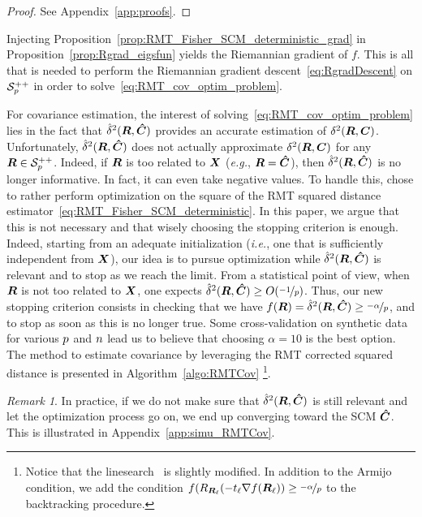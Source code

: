 \documentclass{article}
\theoremstyle{plain}
\theoremstyle{definition}
\theoremstyle{remark}
\newtheorem{remark}[theorem]{Remark}
\begin{document}
\begin{proof}
    See Appendix~\ref{app:proofs}.
\end{proof}
%
Injecting Proposition~\ref{prop:RMT_Fisher_SCM_deterministic_grad} in Proposition~\ref{prop:Rgrad_eigsfun} yields the Riemannian gradient of $f$.
This is all that is needed to perform the Riemannian gradient descent~\eqref{eq:RgradDescent} on $\mathcal{S}^{++}_{p}$ in order to solve~\eqref{eq:RMT_cov_optim_problem}.

For covariance estimation, the interest of solving~\eqref{eq:RMT_cov_optim_problem} lies in the fact that $\hat{\delta}^2(\boldsymbol{R},\boldsymbol{\hat{C}})$ provides an accurate estimation of $\delta^2(\boldsymbol{R},\boldsymbol{C})$.
Unfortunately, $\hat{\delta}^2(\boldsymbol{R},\boldsymbol{\hat{C}})$ does not actually approximate $\delta^2(\boldsymbol{R},\boldsymbol{C})$ for any $\boldsymbol{R}\in\mathcal{S}^{++}_{p}$.
Indeed, if $\boldsymbol{R}$ is too related to $\boldsymbol{X}$ (\emph{e.g.}, $\boldsymbol{R}=\boldsymbol{\hat{C}}$), then $\hat{\delta}^2(\boldsymbol{R},\boldsymbol{\hat{C}})$ is no longer informative.
In fact, it can even take negative values.
%
To handle this, \cite{tiomoko2019random} chose to rather perform optimization on the square of the RMT squared distance estimator~\eqref{eq:RMT_Fisher_SCM_deterministic}.
In this paper, we argue that this is not necessary and that wisely choosing the stopping criterion is enough.
Indeed, starting from an adequate initialization (\emph{i.e.}, one that is sufficiently independent from $\boldsymbol{X}$), our idea is to pursue optimization while $\hat{\delta}^2(\boldsymbol{R},\boldsymbol{\hat{C}})$ is relevant and to stop as we reach the limit.
%
From a statistical point of view, when $\boldsymbol{R}$ is not too related to $\boldsymbol{X}$, one expects $\hat{\delta}^2(\boldsymbol{R},\boldsymbol{\hat{C}})\geq O(\nicefrac{-1}{p})$.
Thus, our new stopping criterion consists in checking that we have $f(\boldsymbol{R})=\hat{\delta}^2(\boldsymbol{R},\boldsymbol{\hat{C}})\geq\nicefrac{-\alpha}{p}$, and to stop as soon as this is no longer true.
Some cross-validation on synthetic data for various $p$ and $n$ lead us to believe that choosing $\alpha=10$ is the best option.
%
The method to estimate covariance by leveraging the RMT corrected squared distance is presented in Algorithm~\ref{algo:RMTCov}%
\footnote{
    Notice that the linesearch~\cite{absil2009optimization,boumal2023introduction} is slightly modified.
    In addition to the Armijo condition, we add the condition $f(R_{\boldsymbol{R}_{\ell}}(-t_{\ell}\nabla f(\boldsymbol{R}_{\ell}))\geq\nicefrac{-\alpha}{p}$ to the backtracking procedure.
}.
\begin{remark}
    In practice, if we do not make sure that $\hat{\delta}^2(\boldsymbol{R},\boldsymbol{\hat{C}})$ is still relevant and let the optimization process go on, we end up converging toward the SCM $\boldsymbol{\hat{C}}$.
    This is illustrated in Appendix~\ref{app:simu_RMTCov}.
\end{remark}
\end{document}
